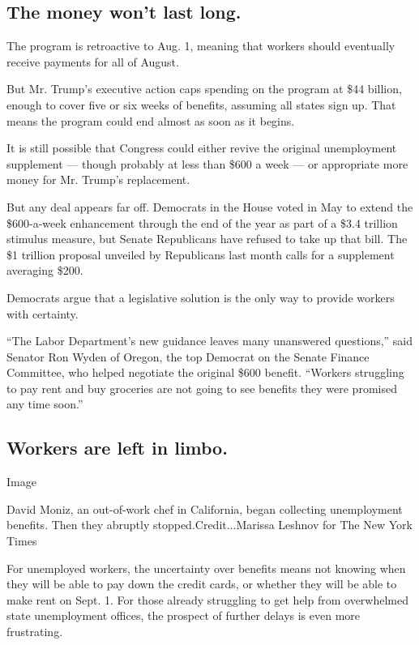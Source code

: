 \hypertarget{the-money-wont-last-long}{%
\subsection{The money won't last long.}\label{the-money-wont-last-long}}

The program is retroactive to Aug. 1, meaning that workers should
eventually receive payments for all of August.

But Mr. Trump's executive action caps spending on the program at \$44
billion, enough to cover five or six weeks of benefits, assuming all
states sign up. That means the program could end almost as soon as it
begins.

It is still possible that Congress could either revive the original
unemployment supplement --- though probably at less than \$600 a week
--- or appropriate more money for Mr. Trump's replacement.

But any deal appears far off. Democrats in the House voted in May to
extend the \$600-a-week enhancement through the end of the year as part
of a \$3.4 trillion stimulus measure, but Senate Republicans have
refused to take up that bill. The \$1 trillion proposal unveiled by
Republicans last month calls for a supplement averaging \$200.

Democrats argue that a legislative solution is the only way to provide
workers with certainty.

``The Labor Department's new guidance leaves many unanswered
questions,'' said Senator Ron Wyden of Oregon, the top Democrat on the
Senate Finance Committee, who helped negotiate the original \$600
benefit. ``Workers struggling to pay rent and buy groceries are not
going to see benefits they were promised any time soon.''

\hypertarget{workers-are-left-in-limbo}{%
\subsection{Workers are left in
limbo.}\label{workers-are-left-in-limbo}}

Image

David Moniz, an out-of-work chef in California, began collecting
unemployment benefits. Then they abruptly stopped.Credit...Marissa
Leshnov for The New York Times

For unemployed workers, the uncertainty over benefits means not knowing
when they will be able to pay down the credit cards, or whether they
will be able to make rent on Sept. 1. For those already struggling to
get help from overwhelmed state unemployment offices, the prospect of
further delays is even more frustrating.

